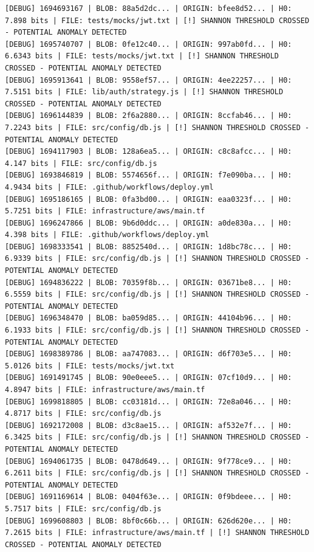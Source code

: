 \documentclass[12pt, a4paper, oneside]{report}
\begin{document}
\newpage
\begin{lstlisting}[basicstyle=\tiny\ttfamily]
[DEBUG] 1694693167 | BLOB: 88a5d2dc... | ORIGIN: bfee8d52... | H0: 7.898 bits | FILE: tests/mocks/jwt.txt | [!] SHANNON THRESHOLD CROSSED - POTENTIAL ANOMALY DETECTED
[DEBUG] 1695740707 | BLOB: 0fe12c40... | ORIGIN: 997ab0fd... | H0: 6.6343 bits | FILE: tests/mocks/jwt.txt | [!] SHANNON THRESHOLD CROSSED - POTENTIAL ANOMALY DETECTED
[DEBUG] 1695913641 | BLOB: 9558ef57... | ORIGIN: 4ee22257... | H0: 7.5151 bits | FILE: lib/auth/strategy.js | [!] SHANNON THRESHOLD CROSSED - POTENTIAL ANOMALY DETECTED
[DEBUG] 1696144839 | BLOB: 2f6a2880... | ORIGIN: 8ccfab46... | H0: 7.2243 bits | FILE: src/config/db.js | [!] SHANNON THRESHOLD CROSSED - POTENTIAL ANOMALY DETECTED
[DEBUG] 1694117903 | BLOB: 128a6ea5... | ORIGIN: c8c8afcc... | H0: 4.147 bits | FILE: src/config/db.js
[DEBUG] 1693846819 | BLOB: 5574656f... | ORIGIN: f7e090ba... | H0: 4.9434 bits | FILE: .github/workflows/deploy.yml
[DEBUG] 1695186165 | BLOB: 0fa3bd00... | ORIGIN: eaa0323f... | H0: 5.7251 bits | FILE: infrastructure/aws/main.tf
[DEBUG] 1696247866 | BLOB: 9b6d0ddc... | ORIGIN: a0de830a... | H0: 4.398 bits | FILE: .github/workflows/deploy.yml
[DEBUG] 1698333541 | BLOB: 8852540d... | ORIGIN: 1d8bc78c... | H0: 6.9339 bits | FILE: src/config/db.js | [!] SHANNON THRESHOLD CROSSED - POTENTIAL ANOMALY DETECTED
[DEBUG] 1694836222 | BLOB: 70359f8b... | ORIGIN: 03671be8... | H0: 6.5559 bits | FILE: src/config/db.js | [!] SHANNON THRESHOLD CROSSED - POTENTIAL ANOMALY DETECTED
[DEBUG] 1696348470 | BLOB: ba059d85... | ORIGIN: 44104b96... | H0: 6.1933 bits | FILE: src/config/db.js | [!] SHANNON THRESHOLD CROSSED - POTENTIAL ANOMALY DETECTED
[DEBUG] 1698389786 | BLOB: aa747083... | ORIGIN: d6f703e5... | H0: 5.0126 bits | FILE: tests/mocks/jwt.txt
[DEBUG] 1691491745 | BLOB: 90e0eee5... | ORIGIN: 07cf10d9... | H0: 4.8947 bits | FILE: infrastructure/aws/main.tf
[DEBUG] 1699818805 | BLOB: cc03181d... | ORIGIN: 72e8a046... | H0: 4.8717 bits | FILE: src/config/db.js
[DEBUG] 1692172008 | BLOB: d3c8ae15... | ORIGIN: af532e7f... | H0: 6.3425 bits | FILE: src/config/db.js | [!] SHANNON THRESHOLD CROSSED - POTENTIAL ANOMALY DETECTED
[DEBUG] 1694061735 | BLOB: 0478d649... | ORIGIN: 9f778ce9... | H0: 6.2611 bits | FILE: src/config/db.js | [!] SHANNON THRESHOLD CROSSED - POTENTIAL ANOMALY DETECTED
[DEBUG] 1691169614 | BLOB: 0404f63e... | ORIGIN: 0f9bdeee... | H0: 5.7517 bits | FILE: src/config/db.js
[DEBUG] 1699608803 | BLOB: 8bf0c66b... | ORIGIN: 626d620e... | H0: 7.2615 bits | FILE: infrastructure/aws/main.tf | [!] SHANNON THRESHOLD CROSSED - POTENTIAL ANOMALY DETECTED

\end{lstlisting}
\end{document}
